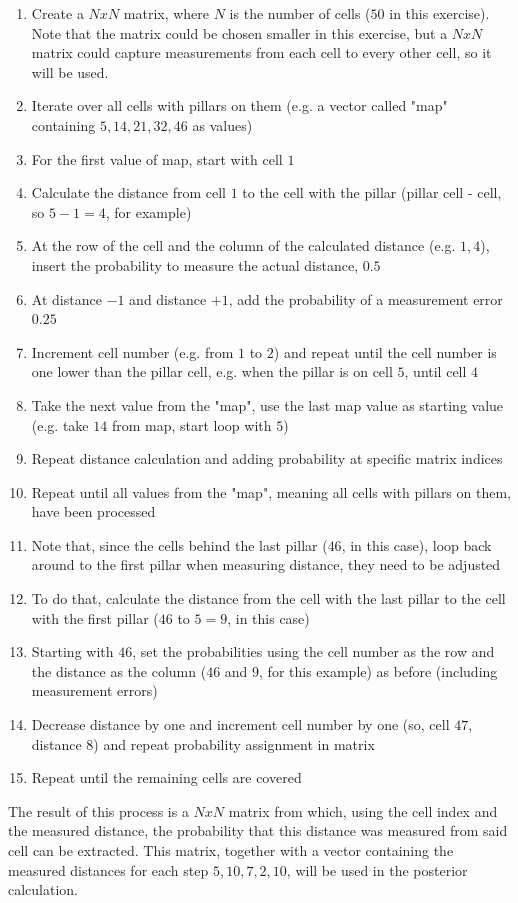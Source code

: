 \documentclass[11pt]{article}
\begin{document}
    \begin{enumerate}
        \item Create a $N x N$ matrix, where $N$ is the number of cells ($50$ in this exercise).
        Note that the matrix could be chosen smaller in this exercise, but a $N x N$ matrix could capture measurements from each cell to every other cell, so it will be used.
        \item Iterate over all cells with pillars on them (e.g. a vector called "map" containing $5, 14, 21, 32, 46$ as values)
        \item For the first value of map, start with cell $1$
        \item Calculate the distance from cell $1$ to the cell with the pillar (pillar cell - cell, so $5 - 1 = 4$, for example)
        \item At the row of the cell and the column of the calculated distance (e.g. $1,4$), insert the probability to measure the actual distance, $0.5$
        \item At distance $- 1$ and distance $+ 1$, add the probability of a measurement error $0.25$
        \item Increment cell number (e.g. from $1$ to $2$) and repeat until the cell number is one lower than the pillar cell, e.g. when the pillar is on cell $5$, until cell $4$
        \item Take the next value from the "map", use the last map value as starting value (e.g. take $14$ from map, start loop with $5$)
        \item Repeat distance calculation and adding probability at specific matrix indices
        \item Repeat until all values from the "map", meaning all cells with pillars on them, have been processed
        \item Note that, since the cells behind the last pillar ($46$, in this case), loop back around to the first pillar when measuring distance, they need to be adjusted
        \item To do that, calculate the distance from the cell with the last pillar to the cell with the first pillar ($46$ to $5 = 9$, in this case)
        \item Starting with $46$, set the probabilities using the cell number as the row and the distance as the column ($46$ and $9$, for this example) as before (including measurement errors)
        \item Decrease distance by one and increment cell number by one (so, cell $47$, distance $8$) and repeat probability assignment in matrix
        \item Repeat until the remaining cells are covered
    \end{enumerate}
    The result of this process is a $N x N$ matrix from which, using the cell index and the measured distance, the probability that this distance was measured from said cell can be extracted.
    This matrix, together with a vector containing the measured distances for each step $5,10,7,2,10$, will be used in the posterior calculation.
\end{document}
